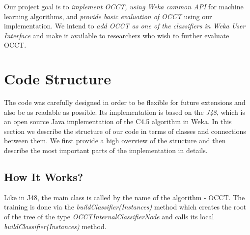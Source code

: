 \documentclass[a4paper,12pt]{article}
\begin{document}
\begin{spacing}{1.5}
Our project goal is to {\em implement OCCT, using Weka common API} for machine learning algorithms, and {\em provide basic evaluation of OCCT} using our implementation. We intend to {\em add OCCT as one of the classifiers in Weka User Interface} and make it available to researchers who wish to further
evaluate OCCT.

\section{Code Structure}
The code was carefully designed in order to be flexible for future extensions and also be as readable as possible. Its implementation is based on the {\em J48}, which is an open source Java implementation of the C4.5 algorithm in Weka. In this section we describe the structure of our code in terms of classes and connections between them. We first provide a high overview of the structure and then describe the most important parts of the implementation in details.

\subsection{How It Works?}
Like in J48, the main class is called by the name of the algorithm - OCCT. The training is done via the {\em buildClassifier(Instances)} method which creates the root of the tree of the type {\em OCCTInternalClassifierNode} and calls its local {\em buildClassifier(Instances)} method.


\end{spacing}
\end{document}
